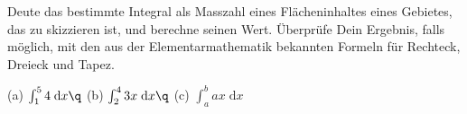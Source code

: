\documentclass[%
11pt,%
twoside,%
titlepage,%
german,%
headsepline%
]{scrartcl}
\begin{document}


\begin{ueb}[geometrisch]
Deute das bestimmte Integral als Masszahl eines Flächeninhaltes eines Gebietes, das zu skizzieren ist, und berechne seinen Wert. Überprüfe Dein Ergebnis, falls möglich, mit den aus der Elementarmathematik bekannten Formeln für Rechteck, Dreieck und Tapez.

(a) $\int_1^54\;\mathrm{d}x\q$ (b) $\int_2^43x\;\mathrm{d}x\q$ (c) $\int_a^bax\;\mathrm{d}x$
\end{ueb}
\end{document}
